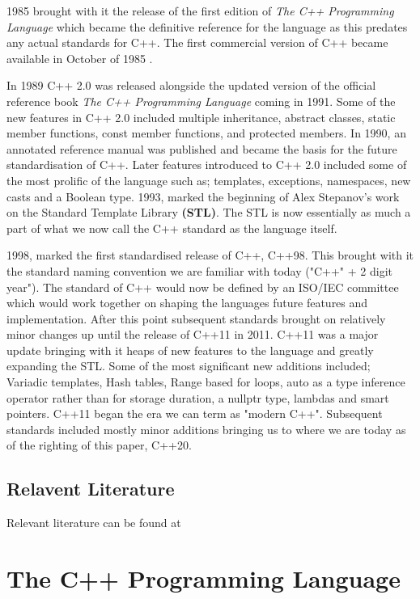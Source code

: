 \documentclass[conference, a4paper]{IEEEtran}
\begin{document}
1985 brought with it the release of the first edition of \textit{The C++ Programming Language} \cite{cpp_1985} which became the definitive reference for the language as this predates any actual standards for C++. The first commercial version of C++ became available in October of 1985 \cite{cppinvention}.

In 1989 C++ 2.0 was released alongside the updated version of the official reference book \textit{The C++ Programming Language} coming in 1991. Some of the new features in C++ 2.0 included multiple inheritance, abstract classes, static member functions, const member functions, and protected members. In 1990, an annotated reference manual was published and became the basis for the future standardisation of C++. Later features introduced to C++ 2.0 included some of the most prolific of the language such as; templates, exceptions, namespaces, new casts and a Boolean type. 1993, marked the beginning of Alex Stepanov's work on the Standard Template Library \textbf{(STL)}. The STL is now essentially as much a part of what we now call the C++ standard as the language itself. 

1998, marked the first standardised release of C++, C++98. This brought with it the standard naming convention we are familiar with today ("C++" + 2 digit year"). The standard of C++ would now be defined by an ISO/IEC committee which would work together on shaping the languages future features and implementation. After this point subsequent standards brought on relatively minor changes up until the release of C++11 in 2011. C++11 was a major update bringing with it heaps of new features to the language and greatly expanding the STL. Some of the most significant new additions included; Variadic templates, Hash tables, Range based for loops, auto as a type inference operator rather than for storage duration, a nullptr type, lambdas and smart pointers. C++11 began the era we can term as "modern C++". Subsequent standards included mostly minor additions bringing us to where we are today as of the righting of this paper, C++20.


\subsection{Relavent Literature}
Relevant literature can be found at \cite{cpphome,cpp_1985,cpphistory,cppoverview,cppevolving,alexandrescu2001modern}

\section{The C++ Programming Language}
\end{document}
